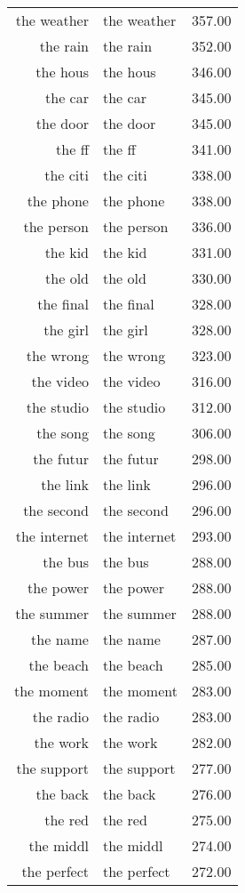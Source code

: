 \begin{table}[ht]
\begin{tabular}{rlr}
  the weather & the weather & 357.00 \\ 
  the rain & the rain & 352.00 \\ 
  the hous & the hous & 346.00 \\ 
  the car & the car & 345.00 \\ 
  the door & the door & 345.00 \\ 
  the ff & the ff & 341.00 \\ 
  the citi & the citi & 338.00 \\ 
  the phone & the phone & 338.00 \\ 
  the person & the person & 336.00 \\ 
  the kid & the kid & 331.00 \\ 
  the old & the old & 330.00 \\ 
  the final & the final & 328.00 \\ 
  the girl & the girl & 328.00 \\ 
  the wrong & the wrong & 323.00 \\ 
  the video & the video & 316.00 \\ 
  the studio & the studio & 312.00 \\ 
  the song & the song & 306.00 \\ 
  the futur & the futur & 298.00 \\ 
  the link & the link & 296.00 \\ 
  the second & the second & 296.00 \\ 
  the internet & the internet & 293.00 \\ 
  the bus & the bus & 288.00 \\ 
  the power & the power & 288.00 \\ 
  the summer & the summer & 288.00 \\ 
  the name & the name & 287.00 \\ 
  the beach & the beach & 285.00 \\ 
  the moment & the moment & 283.00 \\ 
  the radio & the radio & 283.00 \\ 
  the work & the work & 282.00 \\ 
  the support & the support & 277.00 \\ 
  the back & the back & 276.00 \\ 
  the red & the red & 275.00 \\ 
  the middl & the middl & 274.00 \\ 
  the perfect & the perfect & 272.00 \\ 

\end{tabular}
\end{table}

